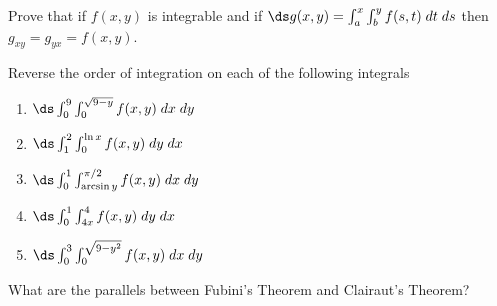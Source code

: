 \begin{enumialphparenastyle}
\begin{ex}
Prove that if $f(x,y)$ is integrable and if $\ds g(x,y)=\int_a^x
    \int_b^y f(s,t) \; dt \; ds$ then $g_{xy}=g_{yx}=f(x,y)$.
\end{ex}

\begin{ex}
Reverse the order of integration on each of the following integrals
\begin{enumerate}
	\item $\ds\int_0^9 \int_0^{\sqrt{9-y}} f(x,y)\; dx \; dy$
	\item $\ds\int_1^2 \int_0^{\ln x} f(x,y) \; dy \; dx $
	\item $\ds\int_0^1 \int_{\arcsin y}^{\pi/2} f(x,y) \; dx \; dy$
	\item $\ds\int_0^1 \int_{4x}^{4} f(x,y) \; dy \; dx$
	\item $\ds\int_0^3 \int_{0}^{\sqrt{9-y^2}} f(x,y) \; dx \; dy$
\end{enumerate}
\end{ex}

\begin{ex}
What are the parallels between Fubini's
    Theorem and Clairaut's Theorem?
\end{ex}

\end{enumialphparenastyle}
